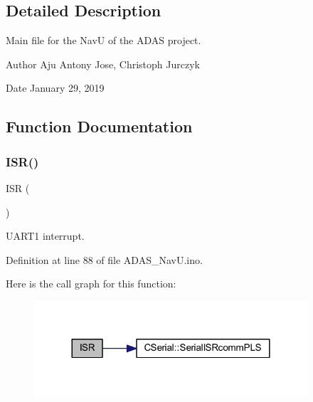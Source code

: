 \subsection{Detailed Description}
Main file for the NavU of the A\+D\+AS project. 

\begin{DoxyAuthor}{Author}
Aju Antony Jose, Christoph Jurczyk 
\end{DoxyAuthor}
\begin{DoxyDate}{Date}
January 29, 2019 
\end{DoxyDate}


\subsection{Function Documentation}
\mbox{\label{_a_d_a_s___nav_u_8ino_ae6e8a8009a9ae0c59f25a496d1cf5a84}} 
\subsubsection{\texorpdfstring{ISR()}{ISR()}\hspace{0.1cm}{\footnotesize\ttfamily [1/2]}}
{\footnotesize\ttfamily I\+SR (\begin{DoxyParamCaption}\item[{U\+S\+A\+R\+T1\+\_\+\+R\+X\+\_\+vect}]{ }\end{DoxyParamCaption})}



U\+A\+R\+T1 interrupt. 



Definition at line 88 of file A\+D\+A\+S\+\_\+\+Nav\+U.\+ino.

Here is the call graph for this function\+:
\nopagebreak
\begin{figure}[H]
\begin{center}
\leavevmode
\includegraphics[width=288pt]{_a_d_a_s___nav_u_8ino_ae6e8a8009a9ae0c59f25a496d1cf5a84_cgraph}
\end{center}
\end{figure}
\mbox{\label{_a_d_a_s___nav_u_8ino_a63a86aad9ba2e355fe6380da553f554e}} 
